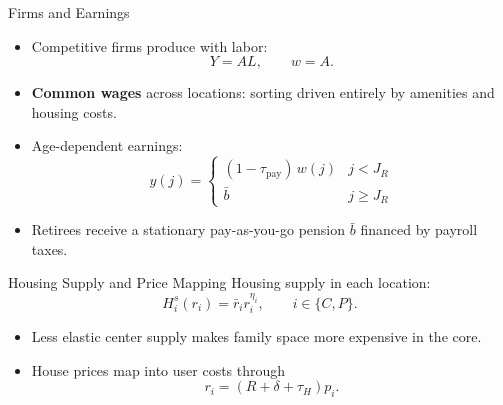\documentclass[11pt,aspectratio=169]{beamer}
\begin{document}
\begin{frame}{Firms and Earnings}
\small
\begin{itemize}
  \item Competitive firms produce with labor:
  \[
  Y = A L, \qquad w = A.
  \]
  \item \textbf{Common wages} across locations: sorting driven entirely by amenities and housing costs.
  \item Age-dependent earnings:
  \[
  y(j) = \begin{cases} (1-\tau_{\mathrm{pay}})\,w(j) & j < J_R \\ \bar{b} & j \geq J_R \end{cases}
  \]
  \item Retirees receive a stationary pay-as-you-go pension $\bar b$ financed by payroll taxes.
\end{itemize}
\end{frame}


\begin{frame}{Housing Supply and Price Mapping}
\small
Housing supply in each location:
\[
H_i^s(r_i) = \bar r_i r_i^{\eta_i},
\qquad i \in \{C,P\}.
\]
\begin{itemize}
  \item Less elastic center supply makes family space more expensive in the core.
  \item House prices map into user costs through
  \[
  r_i = (R+\delta+\tau_H)p_i.
  \]

\end{itemize}
\end{frame}
\end{document}
